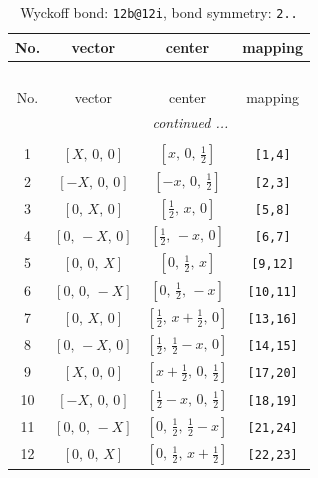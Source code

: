 \documentclass[fleqn,8pt]{jsarticle}
\begin{document}
\renewcommand{\arraystretch}{1.2}
\begin{longtable}{cccc}
\caption{Wyckoff bond: {\tt 12b@12i}, bond symmetry: {\tt 2..}}
 \\
 \hline \hline
No. & vector & center & mapping \\ \hline \endfirsthead

\multicolumn{3}{l}{\tablename\ \thetable{}} \\
 \hline \hline
No. & vector & center & mapping \\ \hline \endhead

 \hline \hline
\multicolumn{3}{r}{\footnotesize\it continued ...} \\ \endfoot

 \hline \hline
\multicolumn{3}{r}{} \\ \endlastfoot

1 & $\left[ X,\, 0,\, 0 \right]$ & $\left[ x,\, 0,\, \frac{1}{2} \right]$ & {\tt [1,4]} \\ \hline
2 & $\left[ - X,\, 0,\, 0 \right]$ & $\left[ - x,\, 0,\, \frac{1}{2} \right]$ & {\tt [2,3]} \\ \hline
3 & $\left[ 0,\, X,\, 0 \right]$ & $\left[ \frac{1}{2},\, x,\, 0 \right]$ & {\tt [5,8]} \\ \hline
4 & $\left[ 0,\, - X,\, 0 \right]$ & $\left[ \frac{1}{2},\, - x,\, 0 \right]$ & {\tt [6,7]} \\ \hline
5 & $\left[ 0,\, 0,\, X \right]$ & $\left[ 0,\, \frac{1}{2},\, x \right]$ & {\tt [9,12]} \\ \hline
6 & $\left[ 0,\, 0,\, - X \right]$ & $\left[ 0,\, \frac{1}{2},\, - x \right]$ & {\tt [10,11]} \\ \hline
7 & $\left[ 0,\, X,\, 0 \right]$ & $\left[ \frac{1}{2},\, x + \frac{1}{2},\, 0 \right]$ & {\tt [13,16]} \\ \hline
8 & $\left[ 0,\, - X,\, 0 \right]$ & $\left[ \frac{1}{2},\, \frac{1}{2} - x,\, 0 \right]$ & {\tt [14,15]} \\ \hline
9 & $\left[ X,\, 0,\, 0 \right]$ & $\left[ x + \frac{1}{2},\, 0,\, \frac{1}{2} \right]$ & {\tt [17,20]} \\ \hline
10 & $\left[ - X,\, 0,\, 0 \right]$ & $\left[ \frac{1}{2} - x,\, 0,\, \frac{1}{2} \right]$ & {\tt [18,19]} \\ \hline
11 & $\left[ 0,\, 0,\, - X \right]$ & $\left[ 0,\, \frac{1}{2},\, \frac{1}{2} - x \right]$ & {\tt [21,24]} \\ \hline
12 & $\left[ 0,\, 0,\, X \right]$ & $\left[ 0,\, \frac{1}{2},\, x + \frac{1}{2} \right]$ & {\tt [22,23]} \\
\end{longtable}
\end{document}
